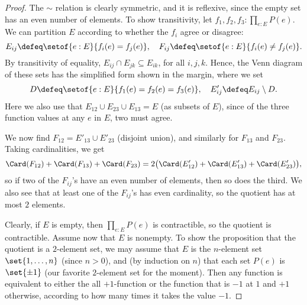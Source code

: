 \begin{proof}
  The $\sim$ relation is clearly symmetric, and it is reflexive, since the empty set
  has an even number of elements.
  To show transitivity, let $f_1,f_2,f_3:\prod_{e:E}P(e)$.
  We can partition $E$ according to whether the $f_i$ agree or disagree:
  \[
    E_{ij} \defeq \setof{e:E}{f_i(e) = f_j(e)}, \quad
    F_{ij} \defeq \setof{e:E}{f_i(e) \ne f_j(e)}.
  \]
  By transitivity of equality, $E_{ij} \cap E_{jk} \subseteq E_{ik}$, for all $i,j,k$.
  Hence, the Venn diagram of these sets has the simplified form shown in the margin,
  where we set
  \[
    D \defeq \setof{e:E}{f_1(e)=f_2(e)=f_3(e)}, \quad
    E_{ij}' \defeq E_{ij} \setminus D.
  \]
  Here we also use that $E_{12} \cup E_{23} \cup E_{13} = E$ (as subsets of $E$),
  since of the three function values at any $e$ in $E$, two must agree.

  We now find $F_{12} = E'_{13} \cup E'_{23}$ (disjoint union),
  and similarly for $F_{13}$ and $F_{23}$.
  Taking cardinalities, we get
  \[
    \Card(F_{12})+\Card(F_{13})+\Card(F_{23})
    =2\bigl(\Card(E'_{12})+\Card(E'_{13})+\Card(E'_{23})\bigr),
  \]
  so if two of the $F_{ij}$'s have an even number of elements,
  then so does the third.
  We also see that at least one of the $F_{ij}$'s has even cardinality,
  so the quotient has at most $2$ elements.

  Clearly, if $E$ is empty, then $\prod_{e:E}P(e)$ is contractible,
  so the quotient is contractible.
  Assume now that $E$ is nonempty.
  To show the proposition that the quotient is a $2$-element set,
  we may assume that $E$ is the $n$-element set $\set{1,\dots,n}$ (since $n>0$),
  and (by induction on $n$) that each set $P(e)$ is $\set{\pm 1}$
  (our favorite $2$-element set for the moment).
  Then any function is equivalent to either the all $+1$-function
  or the function that is $-1$ at $1$ and $+1$ otherwise,
  according to how many times it takes the value $-1$.
\end{proof}

